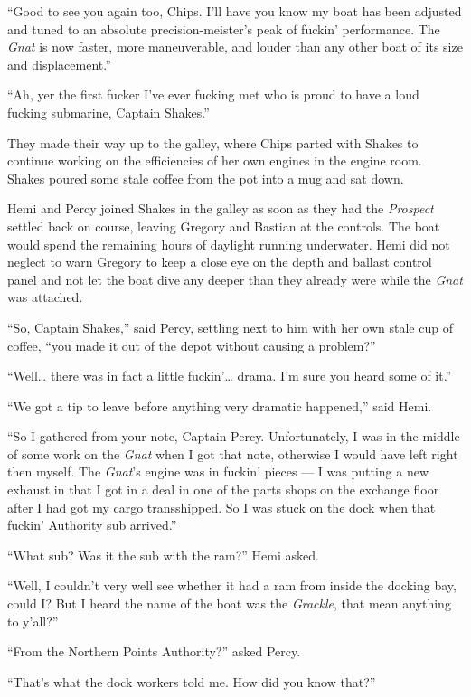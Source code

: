 \documentclass[
]{scrbook}
\begin{document}
``Good to see you again too, Chips. I'll have you know my boat has been
adjusted and tuned to an absolute precision-meister's peak of fuckin'
performance. The \emph{Gnat} is now faster, more maneuverable, and
louder than any other boat of its size and displacement.''

``Ah, yer the first fucker I've ever fucking met who is proud to have a
loud fucking submarine, Captain Shakes.''

They made their way up to the galley, where Chips parted with Shakes to
continue working on the efficiencies of her own engines in the engine
room. Shakes poured some stale coffee from the pot into a mug and sat
down.

Hemi and Percy joined Shakes in the galley as soon as they had the
\emph{Prospect} settled back on course, leaving Gregory and Bastian at
the controls. The boat would spend the remaining hours of daylight
running underwater. Hemi did not neglect to warn Gregory to keep a close
eye on the depth and ballast control panel and not let the boat dive any
deeper than they already were while the \emph{Gnat} was attached.

``So, Captain Shakes,'' said Percy, settling next to him with her own
stale cup of coffee, ``you made it out of the depot without causing a
problem?''

``Well\ldots{} there was in fact a little fuckin'\ldots{} drama. I'm
sure you heard some of it.''

``We got a tip to leave before anything very dramatic happened,'' said
Hemi.

``So I gathered from your note, Captain Percy. Unfortunately, I was in
the middle of some work on the \emph{Gnat} when I got that note,
otherwise I would have left right then myself. The \emph{Gnat}'s engine
was in fuckin' pieces --- I was putting a new exhaust in that I got in a
deal in one of the parts shops on the exchange floor after I had got my
cargo transshipped. So I was stuck on the dock when that fuckin'
Authority sub arrived.''

``What sub? Was it the sub with the ram?'' Hemi asked.

``Well, I couldn't very well see whether it had a ram from inside the
docking bay, could I? But I heard the name of the boat was the
\emph{Grackle}, that mean anything to y'all?''

``From the Northern Points Authority?'' asked Percy.

``That's what the dock workers told me. How did you know that?''
\end{document}

